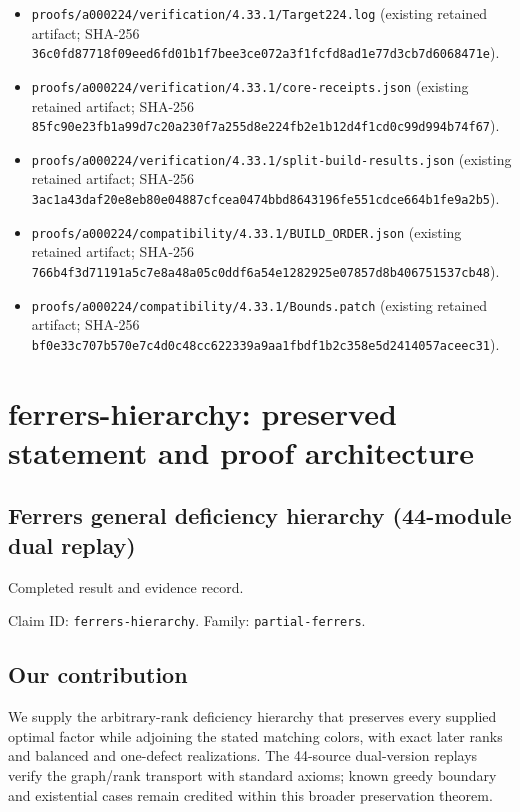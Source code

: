 \documentclass[11pt,a4paper]{article}
\begin{document}
\begin{itemize}
\item \texttt{proofs/a000224/verification/4.33.1/Target224.log} (existing retained artifact; SHA-256 \texttt{36c0fd87718f09eed6fd01b1f7bee3ce072a3f1fcfd8ad1e77d3cb7d6068471e}).
\end{itemize}
\begin{itemize}
\item \texttt{proofs/a000224/verification/4.33.1/core-receipts.json} (existing retained artifact; SHA-256 \texttt{85fc90e23fb1a99d7c20a230f7a255d8e224fb2e1b12d4f1cd0c99d994b74f67}).
\end{itemize}
\begin{itemize}
\item \texttt{proofs/a000224/verification/4.33.1/split-build-results.json} (existing retained artifact; SHA-256 \texttt{3ac1a43daf20e8eb80e04887cfcea0474bbd8643196fe551cdce664b1fe9a2b5}).
\end{itemize}
\begin{itemize}
\item \texttt{proofs/a000224/compatibility/4.33.1/BUILD\_ORDER.json} (existing retained artifact; SHA-256 \texttt{766b4f3d71191a5c7e8a48a05c0ddf6a54e1282925e07857d8b406751537cb48}).
\end{itemize}
\begin{itemize}
\item \texttt{proofs/a000224/compatibility/4.33.1/Bounds.patch} (existing retained artifact; SHA-256 \texttt{bf0e33c707b570e7c4d0c48cc622339a9aa1fbdf1b2c358e5d2414057aceec31}).
\end{itemize}
\clearpage
\section{ferrers-hierarchy: preserved statement and proof architecture}
\subsection{Ferrers general deficiency hierarchy (44-module dual replay)}
Completed result and evidence record.

Claim ID: \texttt{ferrers-hierarchy}. Family: \texttt{partial-ferrers}.

\subsection{Our contribution}
We supply the arbitrary-rank deficiency hierarchy that preserves every supplied optimal factor while adjoining the stated matching colors, with exact later ranks and balanced and one-defect realizations. The 44-source dual-version replays verify the graph/rank transport with standard axioms; known greedy boundary and existential cases remain credited within this broader preservation theorem.
\end{document}
